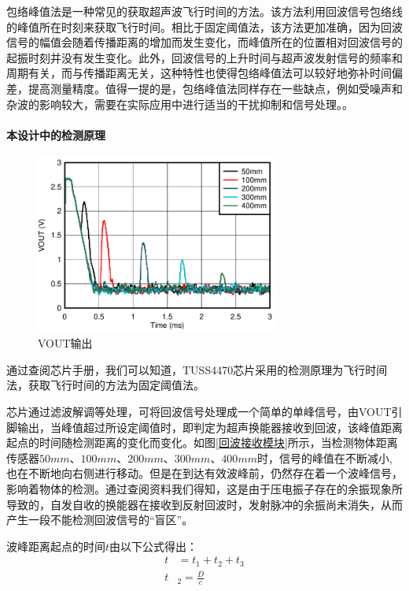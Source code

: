 	包络峰值法是一种常见的获取超声波飞行时间的方法。该方法利用回波信号包络线的峰值所在时刻来获取飞行时间。相比于固定阈值法，该方法更加准确，因为回波信号的幅值会随着传播距离的增加而发生变化，而峰值所在的位置相对回波信号的起振时刻并没有发生变化。此外，回波信号的上升时间与超声波发射信号的频率和周期有关，而与传播距离无关，这种特性也使得包络峰值法可以较好地弥补时间偏差，提高测量精度。值得一提的是，包络峰值法同样存在一些缺点，例如受噪声和杂波的影响较大，需要在实际应用中进行适当的干扰抑制和信号处理。。
	\paragraph{本设计中的检测原理}
		
    \begin{figure}[!h]
     	\centering
    	\includegraphics[width=8cm]{figure/VOUT image.png}
    	\caption{VOUT输出}
    	\label{VOUT输出}
    \end{figure}\par
    通过查阅芯片手册，我们可以知道，TUSS4470芯片采用的检测原理为飞行时间法，获取飞行时间的方法为固定阈值法。\par
    芯片通过滤波解调等处理，可将回波信号处理成一个简单的单峰信号，由VOUT引脚输出，当峰值超过所设定阈值时，即判定为超声换能器接收到回波，该峰值距离起点的时间随检测距离的变化而变化。如图\ref{回波接收模块}所示，当检测物体距离传感器$50mm$、$100mm$、$200mm$、$300mm$、$400mm$时，信号的峰值在不断减小,也在不断地向右侧进行移动。但是在到达有效波峰前，仍然存在着一个波峰信号，影响着物体的检测。通过查阅资料我们得知，这是由于压电振子存在的余振现象所导致的，自发自收的换能器在接收到反射回波时，发射脉冲的余振尚未消失，从而产生一段不能检测回波信号的“盲区”。\par
    波峰距离起点的时间$t$由以下公式得出：       
    \begin{align}
    	t&=t_1+t_2+t_3 \\
    	t&_2=\frac{D}{c}
    	\label{检测周期公式}
    \end{align}  
